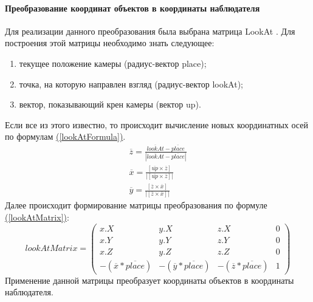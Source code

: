 \documentclass{article}
\begin{document}
	\paragraph{Преобразование координат объектов в координаты наблюдателя}
	\indent Для реализации данного преобразования была выбрана матрица LookAt \cite{lookAtMatrix}. Для построения этой матрицы необходимо знать следующее:
	\begin{enumerate}
		\item текущее положение камеры (радиус-вектор place);
		\item точка, на которую направлен взгляд (радиус-вектор lookAt);
		\item вектор, показывающий крен камеры (вектор up).
	\end{enumerate}
	Если все из этого известно, то происходит вычисление новых координатных осей по формулам \hyperref[lookAtFormula]{(\ref{lookAtFormula})}.
	\begin{equation}\label{lookAtFormula}
	\begin{split}
			 \overline{z} = \frac{\overline{lookAt} - \overline{place}}{|\overline{lookAt} - \overline{place}|} \\
			 \overline{x} = \frac{[\overline{up} \times \overline{z}]}{|[\overline{up} \times \overline{z}]|} \\
			 \overline{y} = \frac{[\overline{z} \times \overline{x}]}{|[\overline{z} \times \overline{x}]|}
	\end{split}
           \end{equation}
	Далее происходит формирование матрицы преобразования по формуле \hyperref[lookAtMatrix]{(\ref{lookAtMatrix})}:
		\begin{equation}\label{lookAtMatrix}
		lookAtMatrix =
		\begin{pmatrix}
		x.X & y.X & z.X & 0\\
		x.Y & y.Y & z.Y & 0\\
		x.Z & y.Z & z.Z & 0\\
		-(\overline{x} * \overline{place}) & -(\overline{y} * \overline{place}) & -(\overline{z} * \overline{place}) & 1
		\end{pmatrix}
		\end{equation}
	Применение данной матрицы преобразует координаты объектов в координаты наблюдателя.
\end{document}
